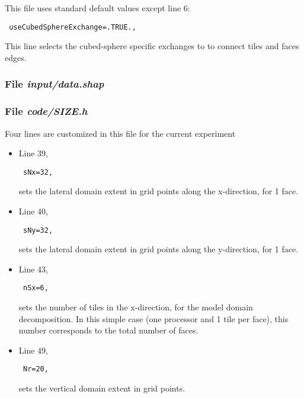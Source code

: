 This file uses standard default values except line 6:
\begin{verbatim}
 useCubedSphereExchange=.TRUE.,
\end{verbatim}
This line selects the cubed-sphere specific exchanges to
to connect tiles and faces edges.

\subsubsection{File {\it input/data.shap}}
\label{www:tutorials}



\subsubsection{File {\it code/SIZE.h}}
\label{www:tutorials}

Four lines are customized in this file for the current experiment

\begin{itemize}

\item Line 39, 
\begin{verbatim} sNx=32, \end{verbatim}
sets the lateral domain extent in grid points along the x-direction,
for 1 face.

\item Line 40,
\begin{verbatim} sNy=32, \end{verbatim} 
sets the lateral domain extent in grid points along the y-direction,
for 1 face.

\item Line 43,
\begin{verbatim} nSx=6, \end{verbatim} 
sets the number of tiles in the x-direction, for the model domain
decomposition. In this simple case (one processor and 1 tile per 
face), this number corresponds to the total number of faces.

\item Line 49, 
\begin{verbatim} Nr=20,   \end{verbatim} 
sets the vertical domain extent in grid points.

\end{itemize}

%

